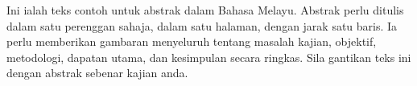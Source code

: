 \begin{abstrak}
Ini ialah teks contoh untuk abstrak dalam Bahasa Melayu. Abstrak perlu ditulis dalam satu perenggan sahaja, dalam satu halaman, dengan jarak satu baris. Ia perlu memberikan gambaran menyeluruh tentang masalah kajian, objektif, metodologi, dapatan utama, dan kesimpulan secara ringkas. Sila gantikan teks ini dengan abstrak sebenar kajian anda.
\end{abstrak}
